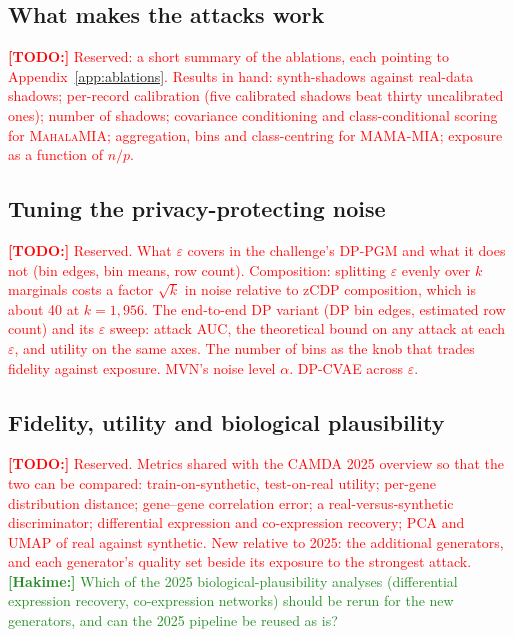 \documentclass[webpdf,contemporary,large]{oup-authoring-template}
\newif\ifdraft \drafttrue
\newcommand{\annot}[3]{\ifdraft\textcolor{#1}{\textbf{[#2:]} #3}\fi}
\newcommand{\hakime}[1]{\annot{ForestGreen}{Hakime}{#1}}
\newcommand{\todo}[1]{\annot{red}{TODO}{#1}}
\newcommand{\mahala}{\textsc{MahalaMIA}}
\newcommand{\mama}{\textsc{MAMA-MIA}}
\begin{document}
\subsection{What makes the attacks work}
\label{sec:exp-ablations}

\todo{Reserved: a short summary of the ablations, each pointing to Appendix~\ref{app:ablations}. Results in hand: synth-shadows against real-data shadows; per-record calibration (five calibrated shadows beat thirty uncalibrated ones); number of shadows; covariance conditioning and class-conditional scoring for \mahala{}; aggregation, bins and class-centring for \mama{}; exposure as a function of $n/p$.}

\subsection{Tuning the privacy-protecting noise}
\label{sec:noise}

\todo{Reserved. What $\varepsilon$ covers in the challenge's DP-PGM and what it does not (bin edges, bin means, row count). Composition: splitting $\varepsilon$ evenly over $k$ marginals costs a factor $\sqrt{k}$ in noise relative to zCDP composition, which is about 40 at $k = 1{,}956$. The end-to-end DP variant (DP bin edges, estimated row count) and its $\varepsilon$ sweep: attack AUC, the theoretical bound on any attack at each $\varepsilon$, and utility on the same axes. The number of bins as the knob that trades fidelity against exposure. MVN's noise level $\alpha$. DP-CVAE across $\varepsilon$.}

\subsection{Fidelity, utility and biological plausibility}
\label{sec:quality}

\todo{Reserved. Metrics shared with the CAMDA 2025 overview so that the two can be compared: train-on-synthetic, test-on-real utility; per-gene distribution distance; gene--gene correlation error; a real-versus-synthetic discriminator; differential expression and co-expression recovery; PCA and UMAP of real against synthetic. New relative to 2025: the additional generators, and each generator's quality set beside its exposure to the strongest attack.}
\hakime{Which of the 2025 biological-plausibility analyses (differential expression recovery, co-expression networks) should be rerun for the new generators, and can the 2025 pipeline be reused as is?}
\end{document}
